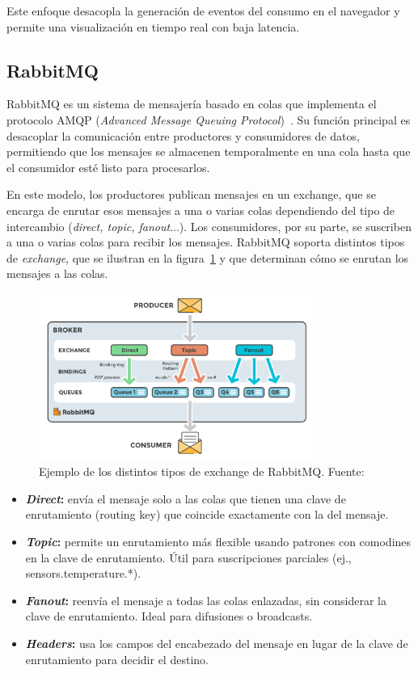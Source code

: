 Este enfoque desacopla la generación de eventos del consumo en el navegador y permite una visualización en tiempo real con baja latencia.

\subsection{RabbitMQ}

RabbitMQ es un sistema de mensajería basado en colas que implementa el protocolo AMQP (\emph{Advanced Message Queuing Protocol})~\cite{rabbitmq_docs}.
Su función principal es desacoplar la comunicación entre productores y consumidores de datos, permitiendo que los mensajes se almacenen temporalmente en una cola hasta que el consumidor esté listo para procesarlos.


En este modelo, los productores publican mensajes en un exchange, que se encarga de enrutar esos mensajes a una o varias colas dependiendo del tipo de intercambio (\emph{direct, topic, fanout}...). Los consumidores, por su parte, se suscriben a una o varias colas para recibir los mensajes.
RabbitMQ soporta distintos tipos de \emph{exchange}, que se ilustran en la figura~\ref{fig:rabbit} y que determinan cómo se enrutan los mensajes a las colas.

\begin{figure}[h]
    \centering
    \includegraphics[width=0.8\textwidth]{Imagenes/Bitmap/rabbitmq}
    \caption{Ejemplo de los distintos tipos de exchange de RabbitMQ. Fuente: \cite{anik_rabbitmq_easy}}
    \label{fig:rabbit}
\end{figure}


\begin{itemize}
    \item \textbf{\emph{Direct}:} envía el mensaje solo a las colas que tienen una clave de enrutamiento (routing key) que coincide exactamente con la del mensaje.

    \item \textbf{\emph{Topic}:} permite un enrutamiento más flexible usando patrones con comodines en la clave de enrutamiento. Útil para suscripciones parciales (ej., sensors.temperature.*).

    \item \textbf{\emph{Fanout}:} reenvía el mensaje a todas las colas enlazadas, sin considerar la clave de enrutamiento. Ideal para difusiones o broadcasts.

    \item \textbf{\emph{Headers}:} usa los campos del encabezado del mensaje en lugar de la clave de enrutamiento para decidir el destino.
\end{itemize}

